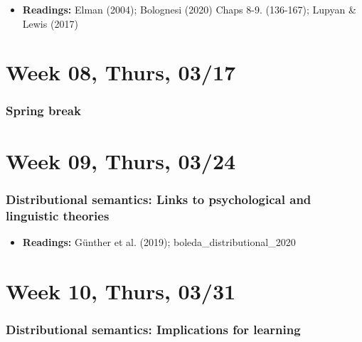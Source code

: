 \documentclass[11pt,man]{article}
\providecommand{\tightlist}{%
  \setlength{\itemsep}{0pt}\setlength{\parskip}{0pt}}
\begin{document}
\begin{itemize}
\tightlist
\item
  \textbf{Readings:} Elman (2004); Bolognesi (2020) Chaps 8-9.
  (136-167); Lupyan \& Lewis (2017)
\end{itemize}

\hypertarget{week-08-thurs-0317}{%
\section{Week 08, Thurs, 03/17}\label{week-08-thurs-0317}}

\hypertarget{spring-break}{%
\subsubsection{Spring break}\label{spring-break}}

\hypertarget{week-09-thurs-0324}{%
\section{Week 09, Thurs, 03/24}\label{week-09-thurs-0324}}

\hypertarget{distributional-semantics-links-to-psychological-and-linguistic-theories}{%
\subsubsection{Distributional semantics: Links to psychological and
linguistic
theories}\label{distributional-semantics-links-to-psychological-and-linguistic-theories}}

\begin{itemize}
\tightlist
\item
  \textbf{Readings:} Günther et al. (2019); boleda\_distributional\_2020
\end{itemize}

\hypertarget{week-10-thurs-0331}{%
\section{Week 10, Thurs, 03/31}\label{week-10-thurs-0331}}

\hypertarget{distributional-semantics-implications-for-learning}{%
\subsubsection{Distributional semantics: Implications for
learning}\label{distributional-semantics-implications-for-learning}}
\end{document}

